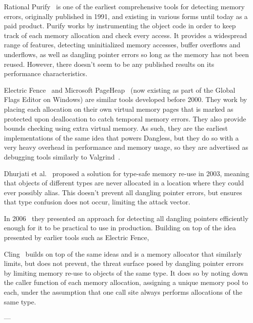 Rational Purify~\cite{hastings1991purify} is one of the earliest comprehensive tools for detecting memory errors, originally published in 1991, and existing in various forms until today as a paid product. Purify works by instrumenting the object code in order to keep track of each memory allocation and check every access. It provides a widespread range of features, detecting uninitialized memory accesses, buffer overflows and underflows, as well as dangling pointer errors so long as the memory has not been reused. However, there doesn't seem to be any published results on its performance characteristics.

Electric Fence~\cite{electric-fence} and Microsoft PageHeap~\cite{pageheap} (now existing as part of the Global Flags Editor on Windows) are similar tools developed before 2000. They work by placing each allocation on their own virtual memory pages that is marked as protected upon deallocation to catch temporal memory errors. They also provide bounds checking using extra virtual memory. As such, they are the earliest implementations of the same idea that powers Dangless, but they do so with a very heavy overhead in performance and memory usage, so they are advertised as debugging tools similarly to Valgrind~\cite{nethercote2007valgrind}.

Dhurjati et al.~\cite{dhurjati2003memory} proposed a solution for type-safe memory re-use in 2003, meaning that objects of different types are never allocated in a location where they could ever possibly alias. This doesn't prevent all dangling pointer errors, but ensures that type confusion does not occur, limiting the attack vector.

In 2006~\cite{dhurjati2006efficiently} they presented an approach for detecting all dangling pointers efficiently enough for it to be practical to use in production. Building on top of the idea presented by earlier tools such as Electric Fence, 

Cling~\cite{akritidis2010cling} builds on top of the same ideas and is a memory allocator that similarly limits, but does not prevent, the threat surface posed by dangling pointer errors by limiting memory re-use to objects of the same type. It does so by noting down the caller function of each memory allocation, assigning a unique memory pool to each, under the assumption that one call site always performs allocations of the same type.

---

\cite{dhurjati2006efficiently}

